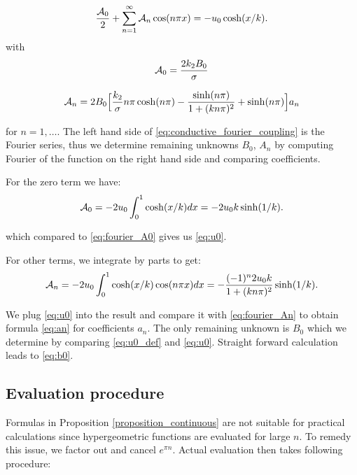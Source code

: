 \documentclass[a4paper,10pt]{article}
\begin{document}
\begin{equation}
    \label{eq:conductive_fourier_coupling}
    \frac{{\cal A}_0}{2} + \sum^{\infty}_{n=1} {\cal A}_n \cos (n\pi x) =  - u_0 \cosh(x/k).
\end{equation}
with
\begin{equation}
    \label{eq:fourier_A0}
    {\cal A}_0 = \frac{2 k_2 B_0}{\sigma} 
\end{equation}


\begin{equation}
    \label{eq:fourier_An} 
        {\cal A}_n = 2B_0 \Bigl[ \frac{k_2}{\sigma} n\pi \cosh(n\pi) - \frac{\sinh(n \pi)}{1 + (k n \pi)^2}  
    + \sinh(n \pi) \Bigr]a_n
\end{equation}

for $n=1, \dots$. The left hand side of \eqref{eq:conductive_fourier_coupling} is the Fourier series, thus we determine
remaining unknowns $B_0$, $A_n$ by computing Fourier of the function on the right hand side and comparing coefficients.

For the zero term we have:
\begin{equation}
    \label{eq:compute_A0}
    {\cal A}_0 = -2 u_0 \int _0^1 \cosh(x/k) dx =
    - 2 u_0 k\sinh(1/k).
\end{equation}

which compared to \eqref{eq:fourier_A0} gives us \eqref{eq:u0}.


For other terms, we integrate by parts to get:
\begin{equation}
    \label{eq:compute_An}
    {\cal A}_n = -2 u_0\int _0^1 \cosh(x/k) \cos (n\pi x) dx 
    = -\frac{(-1)^n 2u_0 k}{1+(k n \pi)^2}\sinh(1/k).
\end{equation}


We plug \eqref{eq:u0} into the result and compare it with \eqref{eq:fourier_An} to obtain
formula \eqref{eq:an} for coefficients $a_n$.
The only remaining unknown is $B_0$ which we determine by comparing \eqref{eq:u0_def} and \eqref{eq:u0}.
Straight forward calculation leads to \eqref{eq:b0}.

\subsection{Evaluation procedure}
Formulas in Proposition \ref{proposition_continuous} are not suitable for practical calculations since hypergeometric functions are evaluated for large $n$.
To remedy this issue, we factor out and cancel $e^{\pi n}$. Actual evaluation then takes  following procedure:
\end{document}
